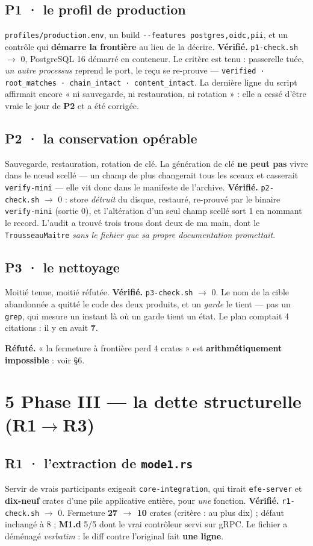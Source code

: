 \documentclass[11pt]{article}
\newcommand{\code}[1]{\texttt{\small #1}}
\newcommand{\pire}[1]{{\color{efered}\textbf{#1}}}
\newcommand{\mm}[1]{\textbf{#1}}
\newcommand{\mesure}[1]{{\color{efeteal}\textbf{Vérifié.} }#1\par}
\newcommand{\refute}[1]{{\color{efered}\textbf{Réfuté.} }#1\par}
\begin{document}
\subsection{\mm{P1} · le profil de production}
\code{profiles/production.env}, un build \code{-{}-features postgres,oidc,pii}, et un contrôle qui
\textbf{démarre la frontière} au lieu de la décrire.
\mesure{\code{p1-check.sh} $\rightarrow$ 0, PostgreSQL 16 démarré en conteneur. Le critère est tenu :
passerelle tuée, \emph{un autre processus} reprend le port, le reçu se re-prouve ---
\code{verified · root\_matches · chain\_intact · content\_intact}. La dernière ligne du script
affirmait encore « ni sauvegarde, ni restauration, ni rotation » : elle a cessé d'être vraie le jour
de \mm{P2} et a été corrigée.}

\subsection{\mm{P2} · la conservation opérable}
Sauvegarde, restauration, rotation de clé. La génération de clé \textbf{ne peut pas} vivre dans le
nœud scellé --- un champ de plus changerait tous les sceaux et casserait \code{verify-mini} --- elle
vit donc dans le manifeste de l'archive.
\mesure{\code{p2-check.sh} $\rightarrow$ 0 : store \emph{détruit} du disque, restauré, re-prouvé par
le binaire \code{verify-mini} (sortie 0), et l'altération d'un seul champ scellé sort 1 en nommant le
record. L'audit a trouvé trois trous dont deux de ma main, dont le \code{TrousseauMaitre} \emph{sans
le fichier que sa propre documentation promettait}.}

\subsection{\mm{P3} · le nettoyage}
Moitié tenue, moitié réfutée.
\mesure{\code{p3-check.sh} $\rightarrow$ 0. Le nom de la cible abandonnée a quitté le code des deux
produits, et un \emph{garde} le tient --- pas un \code{grep}, qui mesure un instant là où un garde
tient un état. Le plan comptait 4 citations : il y en avait \textbf{7}.}
\refute{« la fermeture à frontière perd 4 crates » est \pire{arithmétiquement impossible} : voir
\S6.}

\section{5 \;\textbar\; Phase III --- la dette structurelle (\mm{R1}$\rightarrow$\mm{R3})}

\subsection{\mm{R1} · l'extraction de \code{mode1.rs}}
Servir de vrais participants exigeait \code{core-integration}, qui tirait \code{efe-server} et
\textbf{dix-neuf} crates d'une pile applicative entière, pour \emph{une} fonction.
\mesure{\code{r1-check.sh} $\rightarrow$ 0. Fermeture \textbf{27 $\rightarrow$ 10} crates (critère :
au plus dix) ; défaut inchangé à 8 ; \mm{M1.d} 5/5 dont le vrai contrôleur servi sur gRPC. Le fichier
a déménagé \emph{verbatim} : le diff contre l'original fait \textbf{une ligne}.}
\end{document}
